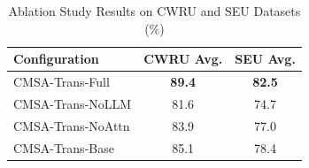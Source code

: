 \begin{table}[htbp]
\centering
\caption{Ablation Study Results on CWRU and SEU Datasets (\%)}
\label{tab:ablation}
\begin{tabular}{lcc}
\toprule
\textbf{Configuration} & \textbf{CWRU Avg.} & \textbf{SEU Avg.} \\
\midrule
CMSA-Trans-Full & \textbf{89.4} & \textbf{82.5} \\
CMSA-Trans-NoLLM & 81.6 & 74.7 \\
CMSA-Trans-NoAttn & 83.9 & 77.0 \\
CMSA-Trans-Base & 85.1 & 78.4 \\
\bottomrule
\end{tabular}
\end{table}
